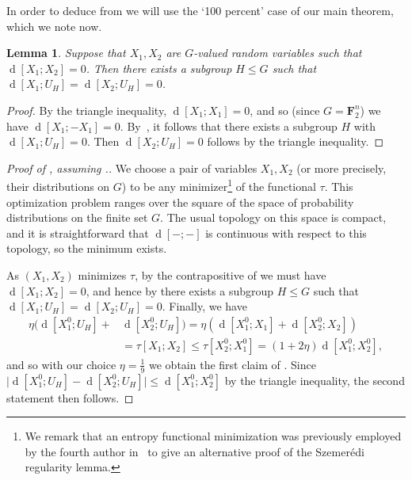 \documentclass[12pt,reqno,tbtags]{amsart}
\newtheorem{lemma}[theorem]{Lemma}
\theoremstyle{definition}
\theoremstyle{remark}
\renewcommand{\leq}{\leqslant}
\renewcommand{\le}{\leq}
\def\F{\mathbf{F}}
\newcommand{\dist}[2]{{\operatorname{d}[#1;#2]}} %
\numberwithin{equation}{section}
\begin{document}
In order to deduce  from  we will use the `100 percent' case of our main theorem, which we note now.
\begin{lemma}%
  \label{lem:100pc}
  Suppose that $X_1,X_2$ are $G$-valued random variables such that
  $\dist{X_1}{X_2}=0$. Then there exists a subgroup $H \leq G$ such that $\dist{X_1}{U_H} = \dist{X_2}{U_H} = 0$.
\end{lemma}
\begin{proof}%
  By the triangle inequality, $\dist{X_1}{X_1} = 0$, and so (since $G=\F_2^n$) we have $\dist{X_1}{-X_1} = 0$. By~\cite[Theorem~1.11(i)]{tao-entropy}, it follows that there exists a subgroup $H$ with $\dist{X_1}{U_H} = 0$.
  Then $\dist{X_2}{U_H}=0$ follows by the triangle inequality.
\end{proof}


\begin{proof}[Proof of , assuming .]
We choose a pair of variables $X_1,X_2$ (or more precisely, their distributions on $G$) to be any minimizer\footnote{We remark that an entropy functional minimization was previously employed by the fourth author in~\cite{tao-regularity} to give an alternative proof of the Szemer\'edi regularity lemma.} of the functional $\tau$.
  This optimization problem ranges over the square of the space of probability distributions on the finite set $G$. The usual topology on this space is compact, and it is straightforward that $\dist{-}{ -}$ is continuous with respect to this topology, so the minimum exists.

As $(X_1,X_2)$ minimizes $\tau$, by the contrapositive of  we must have $\dist{X_1}{X_2}=0$,
and hence by  there exists a subgroup $H \leq G$ such that $\dist{X_1}{U_H} = \dist{X_2}{U_H}=0$.
  Finally, we have
  \begin{align*}
    \eta (\dist{X_1^0}{U_H} + & \dist{X_2^0}{U_H})= \eta (\dist{X_1^0}{X_1} + \dist{X_2^0}{X_2}) \\ & = \tau[X_1;X_2]  \leq \tau[X_2^0;X_1^0] = (1+2\eta) \dist{X_1^0}{X_2^0},
  \end{align*}
and so with our choice $\eta = \frac{1}{9}$ we obtain the first claim of .  Since
  $
    \lvert \dist{X^0_1}{U_H} - \dist{X^0_2}{U_H} \rvert \le \dist{X^0_1}{X^0_2}
  $
  by the triangle inequality, the second statement then follows.
\end{proof}
\end{document}
